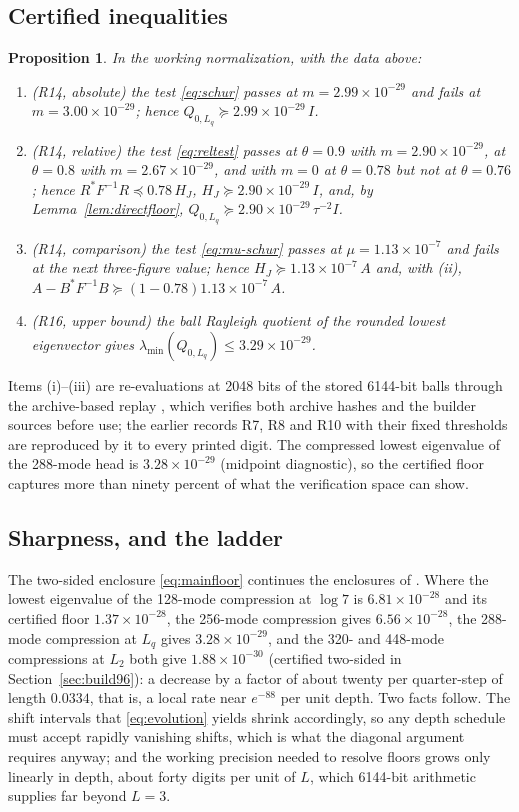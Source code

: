 \documentclass[11pt]{article}
\numberwithin{equation}{section}
\newtheorem{proposition}[theorem]{Proposition}
\theoremstyle{definition}
\theoremstyle{remark}
\newcommand{\rec}[1]{\path{#1}}
\newcommand{\Lq}{L_q}
\newcommand{\Ltwo}{L_2}
\newcommand{\FloorAbs}{2.99\times10^{-29}}          %
\newcommand{\FloorRelNine}{2.90\times10^{-29}}           %
\newcommand{\FloorRelEight}{2.67\times10^{-29}}         %
\newcommand{\ThetaBest}{0.78}                       %
\newcommand{\MuOne}{1.13\times10^{-7}}                         %
\newcommand{\UpperLogSeven}{6.81\times10^{-28}}     %
\newcommand{\LowerLogSeven}{1.37\times10^{-28}}     %
\newcommand{\UpperLq}{3.29\times10^{-29}}                     %
\newcommand{\CompressedA}{6.56\times10^{-28}}       %
\newcommand{\CompressedLq}{3.28\times10^{-29}}      %
\newcommand{\CompressedLtwo}{1.88\times10^{-30}}    %
\begin{document}
\subsection{Certified inequalities}
\begin{proposition}\label{prop:first}
In the working normalization, with the data above:
\begin{enumerate}[label=(\roman*)]
\item (R14, absolute) the test \eqref{eq:schur} passes at $m=\FloorAbs$ and fails at $m=3.00\times10^{-29}$; hence $Q_{0,\Lq}\succeq\FloorAbs\,I$.
\item (R14, relative) the test \eqref{eq:reltest} passes at $\theta=0.9$ with $m=\FloorRelNine$, at $\theta=0.8$ with $m=\FloorRelEight$, and with $m=0$ at $\theta=\ThetaBest$ but not at $\theta=0.76$; hence $R^*F^{-1}R\preceq\ThetaBest\,H_J$, $H_J\succeq\FloorRelNine\,I$, and, by Lemma~\ref{lem:directfloor}, $Q_{0,\Lq}\succeq\FloorRelNine\,\tau^{-2}I$.
\item (R14, comparison) the test \eqref{eq:mu-schur} passes at $\mu=\MuOne$ and fails at the next three-figure value; hence $H_J\succeq\MuOne\,A$ and, with (ii), $A-B^*F^{-1}B\succeq(1-\ThetaBest)\MuOne\,A$.
\item (R16, upper bound) the ball Rayleigh quotient of the rounded lowest eigenvector gives $\lambda_{\min}(Q_{0,\Lq})\le\UpperLq$.
\end{enumerate}
\end{proposition}
Items (i)--(iii) are re-evaluations at 2048 bits of the stored 6144-bit balls through the archive-based replay \rec{replay_floor.py}, which verifies both archive hashes and the builder sources before use; the earlier records R7, R8 and R10 with their fixed thresholds are reproduced by it to every printed digit. The compressed lowest eigenvalue of the 288-mode head is $\CompressedLq$ (midpoint diagnostic), so the certified floor captures more than ninety percent of what the verification space can show.

\subsection{Sharpness, and the ladder}
The two-sided enclosure \eqref{eq:mainfloor} continues the enclosures of \cite{WeilDepth}. Where the lowest eigenvalue of the 128-mode compression at $\log7$ is $\UpperLogSeven$ and its certified floor $\LowerLogSeven$, the 256-mode compression gives $\CompressedA$, the 288-mode compression at $\Lq$ gives $\CompressedLq$, and the 320- and 448-mode compressions at $\Ltwo$ both give $\CompressedLtwo$ (certified two-sided in Section~\ref{sec:build96}): a decrease by a factor of about twenty per quarter-step of length $0.0334$, that is, a local rate near $e^{-88}$ per unit depth. Two facts follow. The shift intervals that \eqref{eq:evolution} yields shrink accordingly, so any depth schedule must accept rapidly vanishing shifts, which is what the diagonal argument requires anyway; and the working precision needed to resolve floors grows only linearly in depth, about forty digits per unit of $L$, which 6144-bit arithmetic supplies far beyond $L=3$.
\end{document}
